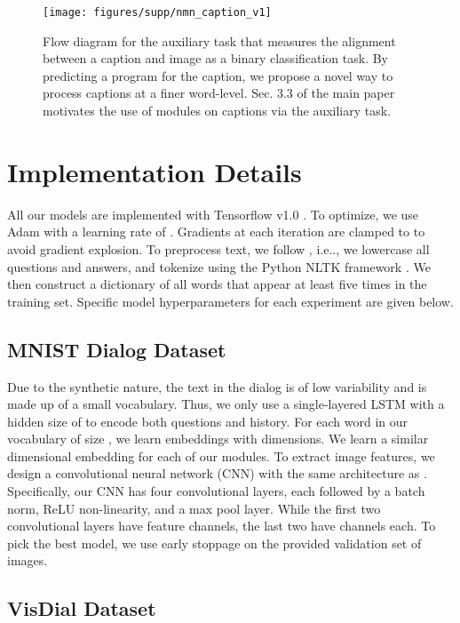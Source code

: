\documentclass[runningheads]{llncs}
\makeatletter
\DeclareRobustCommand\onedot{\futurelet\@let@token\@onedot}
\def\@onedot{\ifx\@let@token.\else.\null\fi\xspace}
\def\ie{i.e\onedot} \def\Ie{I.e\onedot}
\makeatother
\begin{document}
% 
\begin{figure}
	\centering
    \texttt{[image: figures/supp/nmn\_caption\_v1]}
    \caption{
    Flow diagram for the auxiliary task that measures the alignment between a
    caption and image as a binary classification task.
    By predicting a program for the caption, we propose a novel way to
    process captions at a finer word-level.
    Sec. 3.3 of the main paper motivates the use of modules on 
    captions via the auxiliary task.}
    \label{fig:nmn_caption_supp}
\end{figure} 
\section{Implementation Details}
\label{sup:implement_details}

All our models are implemented with Tensorflow v1.0 
\cite{tensorflow2015-whitepaper}.
To optimize, we use Adam \cite{kingma2014adam} with a learning rate of .
Gradients at each iteration are clamped to  to avoid gradient explosion.
To preprocess text, we follow \cite{visdial}, \ie, we lowercase all questions 
and answers, and tokenize using the Python NLTK framework \cite{nltk}.
We then construct a dictionary of all words that appear at least five times in
the training set.
Specific model hyperparameters for each experiment are given below.


\subsection{MNIST Dialog Dataset}

Due to the synthetic nature, the text in the dialog is of low variability 
and is made up of a small vocabulary.
Thus, we only use a single-layered LSTM with a hidden size of  to encode 
both questions and history.
For each word in our vocabulary of size , we learn embeddings with 
dimensions.
We learn a similar dimensional embedding for each of our modules.
To extract image features, we design a convolutional neural network (CNN) with
the same architecture as \cite{paul2017visual}.
Specifically, our CNN has four  convolutional layers, 
each followed by a batch norm, ReLU non-linearity, and a  max pool
layer.
While the first two convolutional layers have  feature channels, the last 
two have  channels each.
To pick the best model, we use early stoppage on the provided validation
set of  images.


\subsection{VisDial Dataset}
\end{document}
